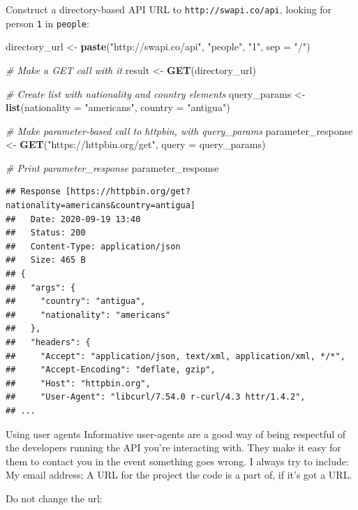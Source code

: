 \documentclass[]{book}
\newenvironment{Shaded}{\begin{snugshade}}{\end{snugshade}}
\newcommand{\CommentTok}[1]{\textcolor[rgb]{0.56,0.35,0.01}{\textit{#1}}}
\newcommand{\DataTypeTok}[1]{\textcolor[rgb]{0.13,0.29,0.53}{#1}}
\newcommand{\KeywordTok}[1]{\textcolor[rgb]{0.13,0.29,0.53}{\textbf{#1}}}
\newcommand{\NormalTok}[1]{#1}
\newcommand{\StringTok}[1]{\textcolor[rgb]{0.31,0.60,0.02}{#1}}
\begin{document}
Construct a directory-based API URL to \texttt{http://swapi.co/api},
looking for person \texttt{1} in \texttt{people}:

\begin{Shaded}
\begin{Highlighting}[]
\NormalTok{directory_url <-}\StringTok{ }\KeywordTok{paste}\NormalTok{(}\StringTok{"http://swapi.co/api"}\NormalTok{, }\StringTok{"people"}\NormalTok{, }\StringTok{"1"}\NormalTok{, }\DataTypeTok{sep =} \StringTok{"/"}\NormalTok{)}

\CommentTok{# Make a GET call with it}
\NormalTok{result <-}\StringTok{ }\KeywordTok{GET}\NormalTok{(directory_url)}

\CommentTok{# Create list with nationality and country elements}
\NormalTok{query_params <-}\StringTok{ }\KeywordTok{list}\NormalTok{(}\DataTypeTok{nationality =} \StringTok{"americans"}\NormalTok{, }
                     \DataTypeTok{country =} \StringTok{"antigua"}\NormalTok{)}

\CommentTok{# Make parameter-based call to httpbin, with query_params}
\NormalTok{parameter_response <-}\StringTok{ }\KeywordTok{GET}\NormalTok{(}\StringTok{"https://httpbin.org/get"}\NormalTok{, }\DataTypeTok{query =}\NormalTok{ query_params)}

\CommentTok{# Print parameter_response}
\NormalTok{parameter_response}
\end{Highlighting}
\end{Shaded}

\begin{verbatim}
## Response [https://httpbin.org/get?nationality=americans&country=antigua]
##   Date: 2020-09-19 13:40
##   Status: 200
##   Content-Type: application/json
##   Size: 465 B
## {
##   "args": {
##     "country": "antigua", 
##     "nationality": "americans"
##   }, 
##   "headers": {
##     "Accept": "application/json, text/xml, application/xml, */*", 
##     "Accept-Encoding": "deflate, gzip", 
##     "Host": "httpbin.org", 
##     "User-Agent": "libcurl/7.54.0 r-curl/4.3 httr/1.4.2", 
## ...
\end{verbatim}

Using user agents
Informative user-agents are a good way of being respectful of the developers running the API you're interacting with. They make it easy for them to contact you in the event something goes wrong. I always try to include:
My email address; A URL for the project the code is a part of, if it's got a URL.

Do not change the url:
\end{document}
